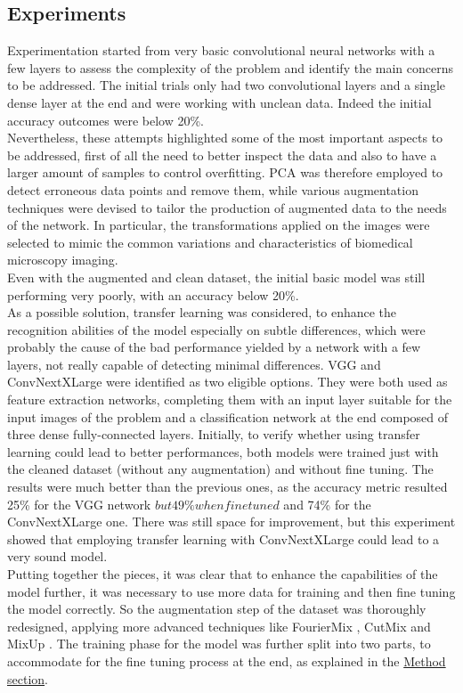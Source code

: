 \documentclass[11pt]{article}
\begin{document}
\begin{multicols}{2}
        \section{Experiments}
		Experimentation started from very basic convolutional neural networks with a few layers to assess the complexity of the problem and identify the main concerns to be addressed. The initial trials only had two convolutional layers and a single dense layer at the end and were working with unclean data. Indeed the initial accuracy outcomes were below 20\%.\\
		Nevertheless, these attempts highlighted some of the most important aspects to be addressed, first of all the need to better inspect the data and also to have a larger amount of samples to control overfitting. PCA \cite{jolliffe2016principal} was therefore employed to detect erroneous data points and remove them, while various augmentation techniques were devised to tailor the production of augmented data to the needs of the network. In particular, the transformations applied on the images were selected to mimic the common variations and characteristics of biomedical microscopy imaging. \\
		Even with the augmented and clean dataset, the initial basic model was still performing very poorly, with an accuracy below 20\%.\\
		As a possible solution, transfer learning was considered, to enhance the recognition abilities of the model especially on subtle differences, which were probably the cause of the bad performance yielded by a network with a few layers, not really capable of detecting minimal differences. VGG and ConvNextXLarge were identified as two eligible options. They were both used as feature extraction networks, completing them with an input layer suitable for the input images of the problem and a classification network at the end composed of three dense fully-connected layers. Initially, to verify whether using transfer learning could lead to better performances, both models were trained just with the cleaned dataset (without any augmentation) and without fine tuning. The results were much better than the previous ones, as the accuracy metric resulted 25\% for the VGG network \(but 49\% when fine tuned\) and 74\% for the ConvNextXLarge one. There was still space for improvement, but this experiment showed that employing transfer learning with ConvNextXLarge could lead to a very sound model.\\
		Putting together the pieces, it was clear that to enhance the capabilities of the model further, it was necessary to use more data for training and then fine tuning the model correctly. So the augmentation step of the dataset was thoroughly redesigned, applying more advanced techniques like FourierMix \cite{fouriermix}, CutMix \cite{cutmix} and MixUp \cite{mixup}. The training phase for the model was further split into two parts, to accommodate for the fine tuning process at the end, as explained in the \hyperref[sec:method]{Method section}.\\

\end{multicols}
\end{document}
